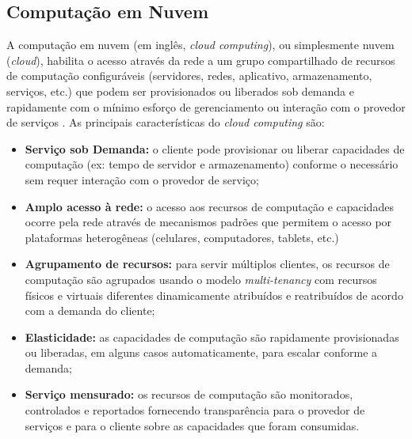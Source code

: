 \subsection{Computação em Nuvem}

A computação em nuvem (em inglês, \emph{cloud computing}), ou simplesmente nuvem
(\emph{cloud}), habilita o acesso através da rede a um grupo compartilhado de
recursos de computação configuráveis (servidores, redes, aplicativo,
armazenamento, serviços, etc.) que podem ser provisionados ou liberados sob
demanda e rapidamente com o mínimo esforço de gerenciamento ou interação com o
provedor de serviços \cite{NIST2011}. As principais características do
\emph{cloud computing} são:


\begin{itemize}
    
    \item \textbf{Serviço sob Demanda:} o cliente pode provisionar ou liberar
    capacidades de computação (ex: tempo de servidor e armazenamento) conforme o
    necessário sem requer interação com o provedor de serviço;
    
    \item \textbf{Amplo acesso à rede:} o acesso aos recursos de computação e
    capacidades ocorre pela rede através de mecanismos padrões que permitem o
    acesso por plataformas heterogêneas (celulares, computadores, tablets, etc.)
      
    \item \textbf{Agrupamento de recursos:} para servir múltiplos clientes, os
    recursos de computação são agrupados usando o modelo \emph{multi-tenancy}
    com recursos físicos e virtuais diferentes dinamicamente atribuídos e
    reatribuídos de acordo com a demanda do cliente;
    
    \item \textbf{Elasticidade:} as capacidades de computação são rapidamente
    provisionadas ou liberadas, em alguns casos automaticamente, para escalar
    conforme a demanda;
    
    \item \textbf{Serviço mensurado:} os recursos de computação são monitorados,
    controlados e reportados fornecendo transparência para o provedor de
    serviços e para o cliente sobre as capacidades que foram consumidas.

\end{itemize}

